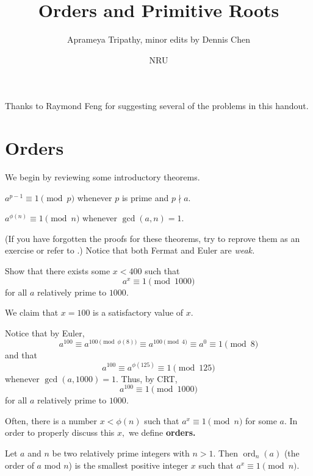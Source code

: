 \documentclass{article}
\title{Orders and Primitive Roots}
\author{Aprameya Tripathy, minor edits by Dennis Chen}
\date{NRU}
\begin{document}
\maketitle

Thanks to Raymond Feng for suggesting several of the problems in this handout.

\section{Orders}
We begin by reviewing some introductory theorems. 

\begin{theo}[Fermat]
$a^{p-1} \equiv 1 \pmod{p}$ whenever $p$ is prime and $p \nmid a.$
\end{theo}

\begin{theo}[Euler]
$a^{\phi(n)} \equiv 1 \pmod{n}$ whenever $\gcd(a, n) = 1.$
\end{theo}

(If you have forgotten the proofs for these theorems, try to reprove them as an exercise or refer to .) Notice that both Fermat and Euler are \emph{weak.}

\begin{exam}
Show that there exists some $x < 400$ such that $$a^x \equiv 1 \pmod{1000}$$ for all $a$ relatively prime to $1000.$
\end{exam}

\begin{sol}
We claim that $x=100$ is a satisfactory value of $x.$

Notice that by Euler, $$a^{100} \equiv a^{100 \pmod{\phi(8)}} \equiv a^{100 \pmod{4}} \equiv a^0 \equiv 1 \pmod{8}$$ and that $$a^{100} \equiv a^{\phi (125)} \equiv 1 \pmod{125}$$ whenever $\gcd(a, 1000) = 1.$ Thus, by CRT, $$a^{100} \equiv 1 \pmod{1000}$$ for all $a$ relatively prime to $1000.$
\end{sol}

Often, there is a number $x < \phi(n)$ such that $a^x \equiv 1 \pmod{n}$ for some $a.$ In order to properly discuss this $x,$ we define \textbf{orders.} 

\begin{defi}[Orders]
Let $a$ and $n$ be two relatively prime integers with $n>1.$ Then $\operatorname{ord}_n(a)$ (the order of $a$ mod $n$) is the smallest positive integer $x$ such that $a^x \equiv 1 \pmod{n}.$
\end{defi}
\end{document}

